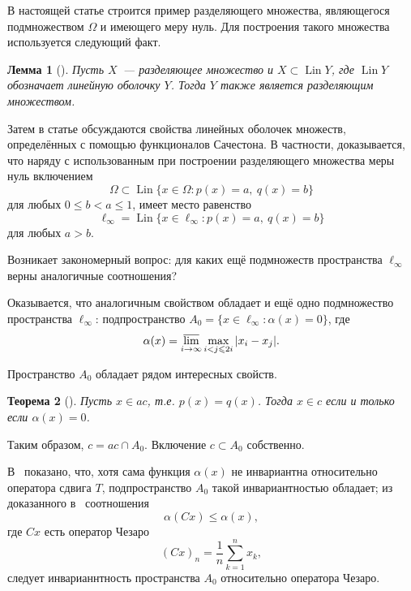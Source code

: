 \documentclass[a4paper,14pt]{article} %
\theoremstyle{plain}
\newtheorem{lemma}{Лемма}[section]
\newtheorem{theorem}[lemma]{Теорема}
\begin{document}
В настоящей статье строится пример разделяющего множества,
являющегося подмножеством $\Omega$ и имеющего меру нуль.
Для построения такого множества используется следующий факт.

\begin{lemma}[{\cite[\S 3, замечание 6]{Semenov2014geomprops}}]
	Пусть $X$~--- разделяющее множество и $X \subset \operatorname{Lin} Y$,
	где $\operatorname{Lin} Y$ обозначает линейную оболочку $Y$.
	Тогда $Y$ также является разделяющим множеством.
\end{lemma}

Затем в статье обсуждаются свойства линейных оболочек множеств, определённых с помощью функционалов Сачестона.
В частности, доказывается,
что наряду с использованным при построении разделяющего множества меры нуль включением
\begin{equation}
	\Omega \subset \operatorname{Lin}\{x\in\Omega : p(x) = a,~ q(x) = b\}
\end{equation}
для любых $0\leq b < a \leq 1$,
имеет место равенство
\begin{equation}
	\ell_\infty = \operatorname{Lin}\{x\in\ell_\infty : p(x) = a,~ q(x) = b\}
\end{equation}
для любых $a>b$.

Возникает закономерный вопрос: для каких ещё подмножеств пространства $\ell_\infty$
верны аналогичные соотношения?

Оказывается, что аналогичным свойством обладает и ещё одно подмножество пространства $\ell_\infty$: подпространство
$A_0 = \{ x \in \ell_\infty : \alpha(x) =0 \}$,
где~\cite{our-vzms-2018}
\begin{equation*}
	\alpha(x) = \varlimsup_{i\to\infty} \max_{i<j\leqslant 2i} |x_i - x_j|
	.
\end{equation*}

Пространство $A_0$ обладает рядом интересных свойств.


\begin{theorem}[{\cite[следствие 2]{our-mz2019ac0}}]
	\label{thm:alpha_c_ac_c}
	Пусть $x\in ac$, т.е. $p(x) = q(x)$.
	Тогда $x\in c$ если и только если $\alpha(x) = 0$.
\end{theorem}
Таким образом, $c = ac \cap A_0$.
Включение $c\subset A_0$ собственно.

В~\cite{our-ped-2018-alpha-Tx} показано, что, хотя сама функция $\alpha(x)$ не инвариантна относительно оператора сдвига $T$,
подпространство $A_0$ такой инвариантностью обладает;
из доказанного в~\cite{SSUZ2} соотношения
\begin{equation}
	\alpha(Cx) \leq \alpha(x)
	,
\end{equation}
где $Cx$ есть оператор Чезаро
\begin{equation}
	(Cx)_n = \frac{1}{n} \sum_{k=1}^n x_k
	,
\end{equation}
следует инварианнтность пространства $A_0$ относительно оператора Чезаро.
\end{document}
